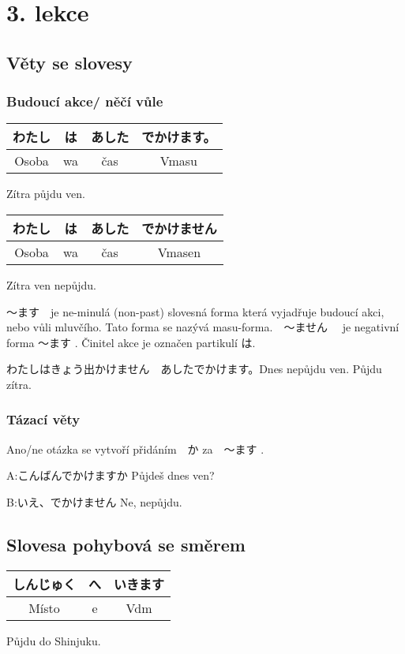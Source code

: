 \section{3. lekce}
\label{sec:lekce_3}

\subsection{Věty se slovesy}

\subsubsection{ Budoucí akce/ něčí vůle}
\begin{center}
\begin{tabular}{||c|c||c||c||}
\hline
わたし&は&あした&でかけます。\\
\hline
Osoba&wa&čas&Vmasu\\
\hline
\end{tabular}
\end{center}
Zítra půjdu ven.

\begin{center}
\begin{tabular}{||c|c||c||c||}
\hline
わたし&は&あした&でかけません\\
\hline
Osoba&wa&čas&Vmasen\\
\hline
\end{tabular}
\end{center}
Zítra ven nepůjdu.

〜ます　je ne-minulá (non-past) slovesná forma která vyjadřuje budoucí akci, nebo vůli mluvčího. Tato forma se nazývá masu-forma.　〜ません　 je negativní forma 〜ます . Činitel akce je označen partikulí は.

わたしはきょう出かけません　あしたでかけます。Dnes nepůjdu ven. Půjdu zítra.


\subsubsection{Tázací věty}

Ano/ne otázka se vytvoří přidáním　か za　〜ます .

A:こんばんでかけますか Půjdeš dnes ven?

B:いえ、でかけません Ne, nepůjdu.


\subsection{Slovesa pohybová se směrem}
\begin{center}
\begin{tabular}{||c|c||c||}
\hline
しんじゅく&へ&いきます\\
\hline
Místo&e&Vdm\\
\hline
\end{tabular}
\end{center}
Půjdu do Shinjuku.


